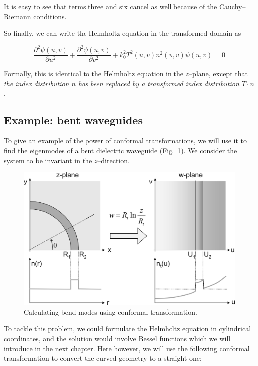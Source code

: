 It is easy to see that terms three and six cancel as well because of the
Cauchy--Riemann conditions.

So finally, we can write the Helmholtz equation in the transformed domain as

\begin{equation}
\frac{\partial^2 \psi(u,v)}{\partial u^2} + \frac{\partial^2 \psi(u,v)}{\partial
v^2} + k_0^2 T^2(u,v)n^2(u,v) \psi(u,v) = 0
\end{equation} 

Formally, this is identical to the Helmholtz equation in the $z$--plane, except
that \emph{the index distribution $n$ has been replaced by a transformed index
distribution $T \cdot n$}.

\subsection{Example: bent waveguides}

To give an example of the power of conformal transformations, we will use it to
find the eigenmodes of a bent dielectric waveguide (Fig.~\ref{fig-bends}). We
consider the system to be invariant in the $z$--direction.

\begin{figure}
\centering
\includegraphics[width=14cm, angle=270]{complex/figures/bends}
\caption{Calculating bend modes using conformal transformation.}
\label{fig-bends}
\end{figure}

To tackle this problem, we could formulate the Helmholtz equation in cylindrical
coordinates, and the solution would involve Bessel functions which we will
introduce in the next chapter. Here however, we will use the following conformal
transformation to convert the curved geometry to a straight one:

